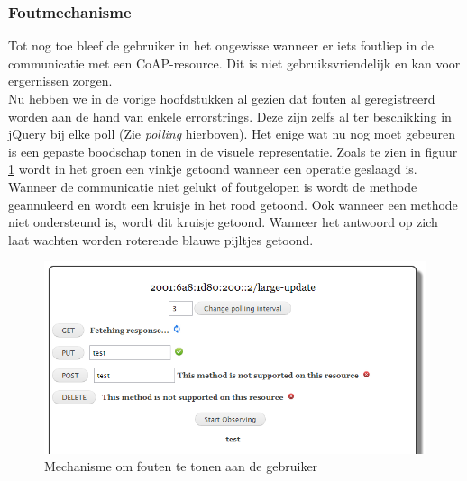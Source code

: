\subsubsection{Foutmechanisme} \label{foutmechanisme}
Tot nog toe bleef de gebruiker in het ongewisse wanneer er iets foutliep in de communicatie met een CoAP-resource. Dit is niet gebruiksvriendelijk en kan voor ergernissen zorgen.\\
Nu hebben we in de vorige hoofdstukken al gezien dat fouten al geregistreerd worden aan de hand van enkele errorstrings. Deze zijn zelfs al ter beschikking in jQuery bij elke poll (Zie \textit{polling} hierboven). Het enige wat nu nog moet gebeuren is een gepaste boodschap tonen in de visuele representatie. Zoals te zien in figuur \ref{fig:foutmechanisme} wordt in het groen een vinkje getoond wanneer een operatie geslaagd is. Wanneer de communicatie niet gelukt of foutgelopen is wordt de methode geannuleerd en wordt een kruisje in het rood getoond. Ook wanneer een methode niet ondersteund is, wordt dit kruisje getoond. Wanneer het antwoord op zich laat wachten worden roterende blauwe pijltjes getoond.

\begin{figure}[h!]
\centering
\includegraphics[width=1\textwidth]{fig/foutmechanisme}
\caption{Mechanisme om fouten te tonen aan de gebruiker}
\label{fig:foutmechanisme}
\end{figure}

\newpage
